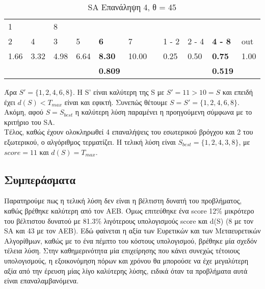 \documentclass[12pt, a4paper]{article}
\begin{document}
\begin{table}[H]
\centering
\begin{tabular}{lllllllllll}
\multicolumn{1}{|l}{1}     & \multicolumn{1}{l|}{\textbf{}} & 8                         &                           &                                    &       &                                &                            &                            &                                     &      \\
\multicolumn{1}{|l|}{2}    & \multicolumn{1}{l|}{4}         & \multicolumn{1}{l|}{3}    & \multicolumn{1}{l|}{5}    & \multicolumn{1}{l|}{\textbf{6}}    & 7     & \multicolumn{1}{l|}{\textbf{}} & \multicolumn{1}{l|}{1 - 2} & \multicolumn{1}{l|}{2 - 4} & \multicolumn{1}{l|}{\textbf{4 - 8}} & out  \\ \cline{1-6} \cline{8-11} 
\multicolumn{1}{|l|}{1.66} & \multicolumn{1}{l|}{3.32}      & \multicolumn{1}{l|}{4.98} & \multicolumn{1}{l|}{6.64} & \multicolumn{1}{l|}{\textbf{8.30}} & 10.00 & \multicolumn{1}{l|}{\textbf{}} & \multicolumn{1}{l|}{0.25}  & \multicolumn{1}{l|}{0.50}  & \multicolumn{1}{l|}{\textbf{0.75}}  & 1.00 \\
                           &                                &                           &                           & \textbf{0.809}                     &       & \textbf{}                      &                            &                            & \textbf{0.519}                      &     
\end{tabular}
\caption{SA Επανάληψη 4, θ = 45}
\label{my-label}
\end{table}

Άρα \(S'=\{1,2,4,6,8\}\). Η S' είναι καλύτερη της S με \(S'=11>10=S\) και επειδή έχει \(d(S) < T_{max}\) είναι και εφικτή. Συνεπώς θέτουμε \(S = S' = \{1,2,4,6,8\}\). Ακόμη, αφού \(S=S_{best}\) η καλύτερη λύση παραμένει η προηγούμενη σύμφωνα με το κριτήριο του SA. \\

Τέλος, καθώς έχουν ολοκληρωθεί 4 επαναλήψεις του εσωτερικού βρόγχου και 2 του εξωτερικού, ο αλγόριθμος τερματίζει. Η τελική λύση είναι \(S_{best} = \{1,2,4,3,8\}\), με \(score = 11\) και \(d(S) = T_{max}\). \\

\subsection{Συμπεράσματα}
Παρατηρούμε πως η τελική λύση δεν είναι η βέλτιστη δυνατή του προβλήματος, καθώς βρέθηκε καλύτερη από τον ΑΕΒ. Όμως επιτεύθηκε ένα score 12\% μικρότερο του βέλτιστου δυνατού με 81.3\% λιγότερους υπολογισμούς score και d(S) (8 με τον SA και 43 με τον ΑΕΒ). Εδώ φαίνεται η αξία των Ευρετικών και των Μεταευρετικών Αλγορίθμων, καθώς με το ένα πέμπτο του κόστους υπολογισμού, βρέθηκε μία σχεδόν τέλεια λύση. Στην καθημερινότητα μία επιχείρησης που κάνει συνεχώς τέτοιους υπολογισμούς, η εξοικονόμηση πόρων και χρόνου θα μπορούσε να έχε μεγαλύτερη αξία από την έρευση μίας λίγο καλύτερης λύσης, ειδικά όταν τα προβλήματα αυτά είναι επαναλαμβανόμενα.
\end{document}
